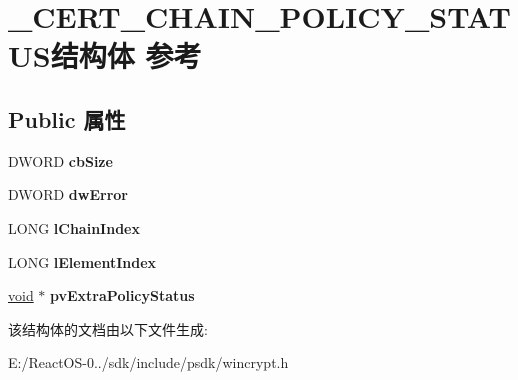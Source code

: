 \hypertarget{struct___c_e_r_t___c_h_a_i_n___p_o_l_i_c_y___s_t_a_t_u_s}{}\section{\+\_\+\+C\+E\+R\+T\+\_\+\+C\+H\+A\+I\+N\+\_\+\+P\+O\+L\+I\+C\+Y\+\_\+\+S\+T\+A\+T\+U\+S结构体 参考}
\label{struct___c_e_r_t___c_h_a_i_n___p_o_l_i_c_y___s_t_a_t_u_s}
\subsection*{Public 属性}
\begin{DoxyCompactItemize}
\item 
\mbox{\label{struct___c_e_r_t___c_h_a_i_n___p_o_l_i_c_y___s_t_a_t_u_s_abc7678dce7f2a69de5138b810d6882f9}} 
D\+W\+O\+RD {\bfseries cb\+Size}
\item 
\mbox{\label{struct___c_e_r_t___c_h_a_i_n___p_o_l_i_c_y___s_t_a_t_u_s_a1da0577f3e856f35dab22d54864adb84}} 
D\+W\+O\+RD {\bfseries dw\+Error}
\item 
\mbox{\label{struct___c_e_r_t___c_h_a_i_n___p_o_l_i_c_y___s_t_a_t_u_s_a104d6066f549d40511697fa0fc6b1085}} 
L\+O\+NG {\bfseries l\+Chain\+Index}
\item 
\mbox{\label{struct___c_e_r_t___c_h_a_i_n___p_o_l_i_c_y___s_t_a_t_u_s_a870fbd3585c3b23a77926fe9fd863204}} 
L\+O\+NG {\bfseries l\+Element\+Index}
\item 
\mbox{\label{struct___c_e_r_t___c_h_a_i_n___p_o_l_i_c_y___s_t_a_t_u_s_a23d88553ccdc276a2b4df9398a55ab21}} 
\hyperlink{interfacevoid}{void} $\ast$ {\bfseries pv\+Extra\+Policy\+Status}
\end{DoxyCompactItemize}


该结构体的文档由以下文件生成\+:\begin{DoxyCompactItemize}
\item 
E\+:/\+React\+O\+S-\/0../sdk/include/psdk/wincrypt.\+h\end{DoxyCompactItemize}
